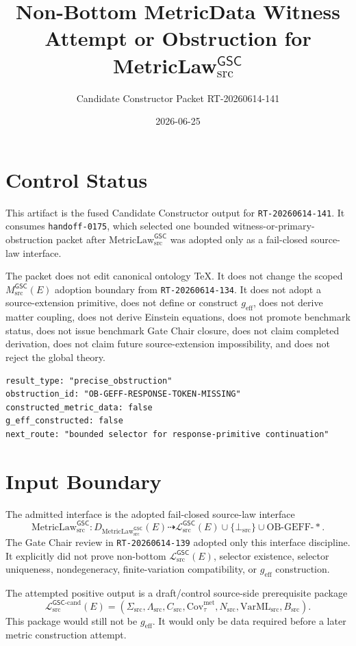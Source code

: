 \documentclass[11pt]{article}
\title{Non-Bottom MetricData Witness Attempt or Obstruction for MetricLaw\(_{\mathrm{src}}^{\mathsf{GSC}}\)}
\author{Candidate Constructor Packet RT-20260614-141}
\date{2026-06-25}
\newcommand{\MsrcGSC}{M_{\mathrm{src}}^{\mathsf{GSC}}}
\newcommand{\MetricLaw}{\mathrm{MetricLaw}_{\mathrm{src}}^{\mathsf{GSC}}}
\newcommand{\MetricData}{\mathcal{L}_{\mathrm{src}}^{\mathsf{GSC}}}
\newcommand{\MetricDataCand}{\mathcal{L}_{\mathrm{src}}^{\mathsf{GSC}\mbox{-}\mathrm{cand}}}
\newcommand{\BottomSrc}{\bot_{\mathrm{src}}}
\newcommand{\geff}{g_{\mathrm{eff}}}
\begin{document}
\maketitle

\section{Control Status}

This artifact is the fused Candidate Constructor output for
\texttt{RT-20260614-141}. It consumes \texttt{handoff-0175}, which selected
one bounded witness-or-primary-obstruction packet after
\(\MetricLaw\) was adopted only as a fail-closed source-law interface.

The packet does not edit canonical ontology TeX. It does not change the scoped
\(\MsrcGSC(E)\) adoption boundary from \texttt{RT-20260614-134}. It does not
adopt a source-extension primitive, does not define or construct \(\geff\),
does not derive matter coupling, does not derive Einstein equations, does not
promote benchmark status, does not issue benchmark Gate Chair closure, does
not claim completed derivation, does not claim future source-extension
impossibility, and does not reject the global theory.

\begin{verbatim}
result_type: "precise_obstruction"
obstruction_id: "OB-GEFF-RESPONSE-TOKEN-MISSING"
constructed_metric_data: false
g_eff_constructed: false
next_route: "bounded selector for response-primitive continuation"
\end{verbatim}

\section{Input Boundary}

The admitted interface is the adopted fail-closed source-law interface
\[
  \MetricLaw:
  D_{\MetricLaw}(E)
  \dashrightarrow
  \MetricData(E)
  \cup \{\BottomSrc\}
  \cup \mathrm{OB\mbox{-}GEFF\mbox{-}*}.
\]
The Gate Chair review in \texttt{RT-20260614-139} adopted only this interface
discipline. It explicitly did not prove non-bottom \(\MetricData(E)\),
selector existence, selector uniqueness, nondegeneracy, finite-variation
compatibility, or \(\geff\) construction.

The attempted positive output is a draft/control source-side prerequisite
package
\[
  \MetricDataCand(E)
  =
  (
    \Sigma_{\mathrm{src}},
    \Lambda_{\mathrm{src}},
    C_{\mathrm{src}},
    \mathrm{Cov}_{\tau}^{\mathrm{met}},
    N_{\mathrm{src}},
    \mathrm{VarML}_{\mathrm{src}},
    B_{\mathrm{src}}
  ).
\]
This package would still not be \(\geff\). It would only be data required
before a later metric construction attempt.
\end{document}
